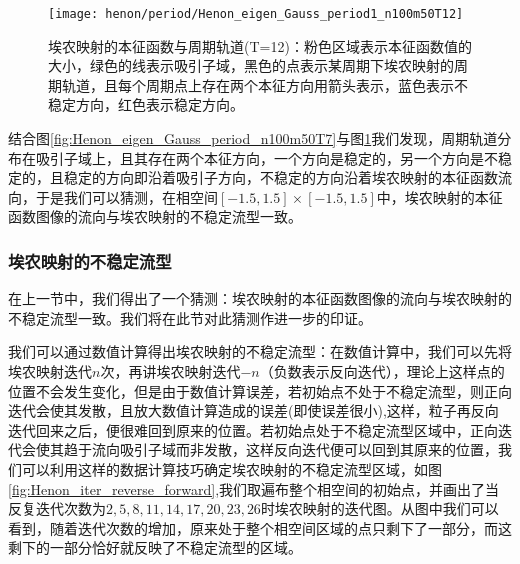 \begin{figure}
	\centering
	\texttt{[image: henon/period/Henon\_eigen\_Gauss\_period1\_n100m50T12]}
    \caption[埃农映射的本征函数与周期轨道]{埃农映射的本征函数与周期轨道(T=12)：粉色区域表示本征函数值的大小，绿色的线表示吸引子域，黑色的点表示某周期下埃农映射的周期轨道，且每个周期点上存在两个本征方向用箭头表示，蓝色表示不稳定方向，红色表示稳定方向。}\label{fig:Henon_eigen_Gauss_period1_n100m50T12}
\end{figure}
结合图\ref{fig:Henon_eigen_Gauss_period_n100m50T7}与图\ref{fig:Henon_eigen_Gauss_period1_n100m50T12}我们发现，周期轨道分布在吸引子域上，且其存在两个本征方向，一个方向是稳定的，另一个方向是不稳定的，且稳定的方向即沿着吸引子方向，不稳定的方向沿着埃农映射的本征函数流向，于是我们可以猜测，在相空间$[-1.5,1.5]\times [-1.5,1.5]$中，埃农映射的本征函数图像的流向与埃农映射的不稳定流型一致。

\subsubsection{埃农映射的不稳定流型}
在上一节中，我们得出了一个猜测：埃农映射的本征函数图像的流向与埃农映射的不稳定流型一致。我们将在此节对此猜测作进一步的印证。

我们可以通过数值计算得出埃农映射的不稳定流型：在数值计算中，我们可以先将埃农映射迭代$n$次，再讲埃农映射迭代$-n$（负数表示反向迭代），理论上这样点的位置不会发生变化，但是由于数值计算误差，若初始点不处于不稳定流型，则正向迭代会使其发散，且放大数值计算造成的误差(即使误差很小),这样，粒子再反向迭代回来之后，便很难回到原来的位置。若初始点处于不稳定流型区域中，正向迭代会使其趋于流向吸引子域而非发散，这样反向迭代便可以回到其原来的位置，我们可以利用这样的数据计算技巧确定埃农映射的不稳定流型区域，如图\ref{fig:Henon_iter_reverse_forward},我们取遍布整个相空间的初始点，并画出了当反复迭代次数为$2,5,8,11,14,17,20,23,26$时埃农映射的迭代图。从图中我们可以看到，随着迭代次数的增加，原来处于整个相空间区域的点只剩下了一部分，而这剩下的一部分恰好就反映了不稳定流型的区域。

